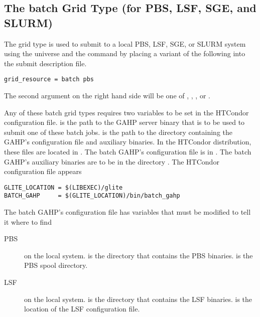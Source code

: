 \subsection{\label{sec:batch}The batch Grid Type (for PBS, LSF, SGE, and SLURM) }
\label{sec:PBS}
\label{sec:LSF}
\label{sec:SGE}
\label{sec:SLURM}

The  grid type is used to submit to a local PBS, LSF, SGE, or SLURM
system using the  universe and the
 command by placing a variant of the following
into the submit description file.
\begin{verbatim}
grid_resource = batch pbs
\end{verbatim}

The second argument on the right hand side will be one of
, , , or .

Any of these batch grid types requires two variables to be set in the HTCondor
configuration file.
 is the path to the GAHP server binary that is to be
used to submit one of these batch jobs.
 is the path to the directory containing the GAHP's
configuration file and auxiliary binaries.
In the HTCondor distribution, these files are located in 
.
The batch GAHP's configuration file is in
.
The batch GAHP's auxiliary binaries
are to be in the directory .
The HTCondor configuration file appears

\footnotesize
\begin{verbatim}
GLITE_LOCATION = $(LIBEXEC)/glite
BATCH_GAHP     = $(GLITE_LOCATION)/bin/batch_gahp
\end{verbatim}
\normalsize

The batch GAHP's configuration file has variables that must be
modified to tell it where to find 
\begin{description}
\item[PBS] on the local system.
   is the directory that contains the PBS binaries.
   is the PBS spool directory.
\item[LSF] on the local system.
   is the directory that contains the LSF binaries.
   is the location of the LSF configuration file.
\end{description}


